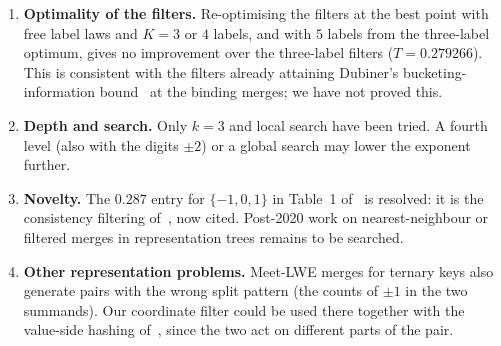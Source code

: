 \documentclass[11pt]{article}
\theoremstyle{definition}
\theoremstyle{remark}
\newcommand{\status}[1]{}   %
\begin{document}
\begin{enumerate}
$2^{12}$ vectors, $2^{18}$ matched pairs, and type-class filters, for $n=40,48,56$ and three seeds each. The overlap
distribution of the matched pairs agrees with that of independent pairs to within $0.002$, and the entry counts,
spurious pairs examined and fraction of valid pairs found are all within about $1\%$ of their predictions, with no
drift in $n$. We then tested two levels: two filtered HGJ merges produce lists of weight-$n/4$ vectors, which are
merged again. Compared with unfiltered level-1 lists built from the same inputs, the filtered ones give the same
overlap law at the next merge (to within $0.003$), the same overlap law between members of one list, and the
predicted fraction of valid pairs found; filtering slightly \emph{reduces} the sharing of summands between outputs
($0.30$--$0.39$ of used summands appear in two or more outputs, against $0.32$--$0.42$ unfiltered). Still untested is
the BBSS digit set, whose optimal digit fractions are too small to realise at these sizes.
\status{numerical; scripts sim\_merge.py and sim\_two\_level.py}
\item \textbf{Optimality of the filters.} Re-optimising the filters at the best point with free label laws and
$K=3$ or $4$ labels, and with $5$ labels from the three-label optimum, gives no improvement over the three-label filters
($T=0.279266$). This is consistent with the filters already attaining Dubiner's bucketing-information
bound~\cite{Dub10} at the binding merges; we have not proved this.
\status{numerical; lsf\_klabel\_check.py}
\item \textbf{Depth and search.} Only $k=3$ and local search have been tried. A fourth level (also with the
digits $\pm2$) or a global search may lower the exponent further.
\status{open}
\item \textbf{Novelty.} The $0.287$ entry for $\{-1,0,1\}$ in Table~1 of~\cite{BBSS20} is resolved: it is the
consistency filtering of~\cite{Oze16}, now cited. Post-2020 work on nearest-neighbour or filtered merges in
representation trees remains to be searched.
\status{0.287 entry resolved; post-2020 search open}
\item \textbf{Other representation problems.} Meet-LWE merges for ternary keys also generate pairs with the wrong
split pattern (the counts of $\pm1$ in the two summands). Our coordinate filter could be used there together with
the value-side hashing of~\cite{KM21}, since the two act on different parts of the pair.
\status{open}
\end{enumerate}
\end{document}

